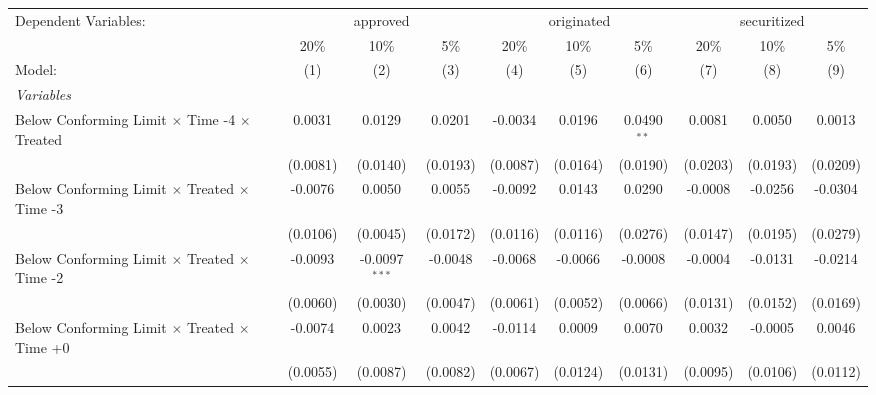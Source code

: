 \begingroup
\centering
\begin{tabular}{lccccccccc}
   \tabularnewline \midrule \midrule
   Dependent Variables: & \multicolumn{3}{c}{approved} & \multicolumn{3}{c}{originated} & \multicolumn{3}{c}{securitized}\\
                                                              & 20\%           & 10\%            & 5\%            & 20\%          & 10\%           & 5\%           & 20\%      & 10\%      & 5\% \\    
   Model:                                                     & (1)            & (2)             & (3)            & (4)           & (5)            & (6)           & (7)       & (8)       & (9)\\  
   \midrule
   \emph{Variables}\\
   Below Conforming Limit $\times$ Time -4 $\times$ Treated   & 0.0031         & 0.0129          & 0.0201         & -0.0034       & 0.0196         & 0.0490$^{**}$ & 0.0081    & 0.0050    & 0.0013\\   
                                                              & (0.0081)       & (0.0140)        & (0.0193)       & (0.0087)      & (0.0164)       & (0.0190)      & (0.0203)  & (0.0193)  & (0.0209)\\   
   Below Conforming Limit $\times$ Treated $\times$ Time -3   & -0.0076        & 0.0050          & 0.0055         & -0.0092       & 0.0143         & 0.0290        & -0.0008   & -0.0256   & -0.0304\\   
                                                              & (0.0106)       & (0.0045)        & (0.0172)       & (0.0116)      & (0.0116)       & (0.0276)      & (0.0147)  & (0.0195)  & (0.0279)\\   
   Below Conforming Limit $\times$ Treated $\times$ Time -2   & -0.0093        & -0.0097$^{***}$ & -0.0048        & -0.0068       & -0.0066        & -0.0008       & -0.0004   & -0.0131   & -0.0214\\   
                                                              & (0.0060)       & (0.0030)        & (0.0047)       & (0.0061)      & (0.0052)       & (0.0066)      & (0.0131)  & (0.0152)  & (0.0169)\\   
   Below Conforming Limit $\times$ Treated $\times$ Time +0   & -0.0074        & 0.0023          & 0.0042         & -0.0114       & 0.0009         & 0.0070        & 0.0032    & -0.0005   & 0.0046\\   
                                                              & (0.0055)       & (0.0087)        & (0.0082)       & (0.0067)      & (0.0124)       & (0.0131)      & (0.0095)  & (0.0106)  & (0.0112)\\   

\end{tabular}
